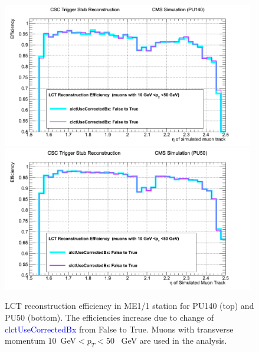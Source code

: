 \begin{figure}[h!]
\includegraphics[width=0.98\textwidth]{figures/PU140_Improv_from4_to_5.png}
\includegraphics[width=0.98\textwidth]{figures/PU50_Improv_from4_to_5.png}
\caption{LCT reconstruction efficiency in ME1/1 station for PU140 (top) and PU50 (bottom). The efficiencies increase due to change of \textcolor{blue}{clctUseCorrectedBx} from False to True. Muons with transverse momentum $10$~GeV$<p_T<50$~ GeV are used in the analysis.}
\label{fig:From4to5}
\end{figure}
